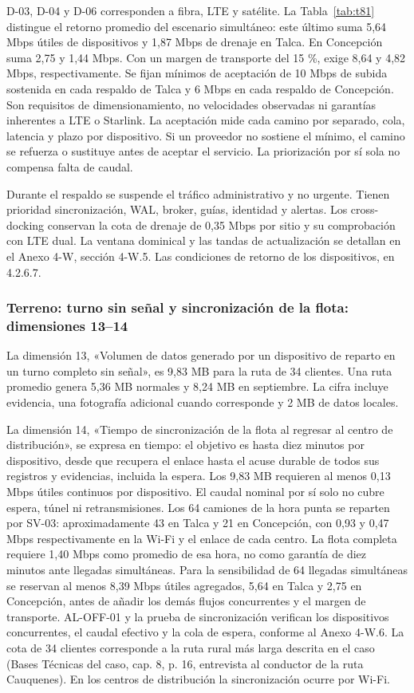D-03, D-04 y D-06 corresponden a fibra, LTE y satélite. La Tabla~\ref{tab:t81} distingue el retorno promedio del escenario simultáneo: este último suma 5,64 Mbps útiles de dispositivos y 1,87 Mbps de drenaje en Talca. En Concepción suma 2,75 y 1,44 Mbps. Con un margen de transporte del 15 \%, exige 8,64 y 4,82 Mbps, respectivamente. Se fijan mínimos de aceptación de 10 Mbps de subida sostenida en cada respaldo de Talca y 6 Mbps en cada respaldo de Concepción. Son requisitos de dimensionamiento, no velocidades observadas ni garantías inherentes a LTE o Starlink. La aceptación mide cada camino por separado, cola, latencia y plazo por dispositivo. Si un proveedor no sostiene el mínimo, el camino se refuerza o sustituye antes de aceptar el servicio. La priorización por sí sola no compensa falta de caudal.

Durante el respaldo se suspende el tráfico administrativo y no urgente. Tienen prioridad sincronización, WAL, broker, guías, identidad y alertas. Los cross-docking conservan la cota de drenaje de 0,35 Mbps por sitio y su comprobación con LTE dual. La ventana dominical y las tandas de actualización se detallan en el Anexo 4-W, sección 4-W.5. Las condiciones de retorno de los dispositivos, en 4.2.6.7.

\subsubsection{Terreno: turno sin señal y sincronización de la flota: dimensiones 13–14}
\label{sec:dimensionamiento-terreno}

La dimensión 13, «Volumen de datos generado por un dispositivo de reparto en un turno completo sin señal», es 9,83 MB para la ruta de 34 clientes. Una ruta promedio genera 5,36 MB normales y 8,24 MB en septiembre. La cifra incluye evidencia, una fotografía adicional cuando corresponde y 2 MB de datos locales.

La dimensión 14, «Tiempo de sincronización de la flota al regresar al centro de distribución», se expresa en tiempo: el objetivo es hasta diez minutos por dispositivo, desde que recupera el enlace hasta el acuse durable de todos sus registros y evidencias, incluida la espera. Los 9,83 MB requieren al menos 0,13 Mbps útiles continuos por dispositivo. El caudal nominal por sí solo no cubre espera, túnel ni retransmisiones. Los 64 camiones de la hora punta se reparten por SV-03: aproximadamente 43 en Talca y 21 en Concepción, con 0,93 y 0,47 Mbps respectivamente en la Wi-Fi y el enlace de cada centro. La flota completa requiere 1,40 Mbps como promedio de esa hora, no como garantía de diez minutos ante llegadas simultáneas. Para la sensibilidad de 64 llegadas simultáneas se reservan al menos 8,39 Mbps útiles agregados, 5,64 en Talca y 2,75 en Concepción, antes de añadir los demás flujos concurrentes y el margen de transporte. AL-OFF-01 y la prueba de sincronización verifican los dispositivos concurrentes, el caudal efectivo y la cola de espera, conforme al Anexo 4-W.6. La cota de 34 clientes corresponde a la ruta rural más larga descrita en el caso (Bases Técnicas del caso, cap. 8, p. 16, entrevista al conductor de la ruta Cauquenes). En los centros de distribución la sincronización ocurre por Wi-Fi.

